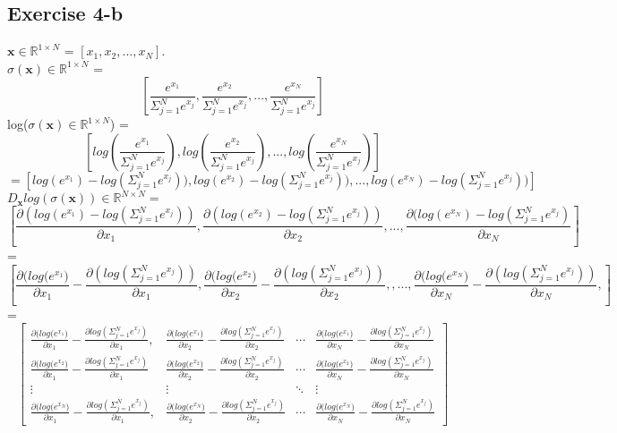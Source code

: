 \subsection*{Exercise 4-b}
$\mathbf{x} \in \mathbb{R}^{1 \times N}$ = $[x_{1}, x_{2},...,x_{N}]$.\\
$\sigma(\mathbf{x}) \in \mathbb{R}^{1 \times N}$ = 
\[
[\frac{e^{x_{1}}}{\Sigma_{j=1}^{N} e^{x_{j}}}, \frac{e^{x_{2}}}{\Sigma_{j=1}^{N} e^{x_{j}}},..., \frac{e^{x_{N}}}{\Sigma_{j=1}^{N} e^{x_{j}}} ]
\]
log($\sigma(\mathbf{x}) \in \mathbb{R}^{1 \times N}$) = 
\[
[log (\frac{e^{x_{1}}}{\Sigma_{j=1}^{N} e^{x_{j}}}),  log(\frac{e^{x_{2}}}{\Sigma_{j=1}^{N} e^{x_{j}}}),..., log (\frac{e^{x_{N}}}{\Sigma_{j=1}^{N} e^{x_{j}}})]
\]
\[
= [log({e^{x_{1}}})-log({\Sigma_{j=1}^{N} e^{x_{j}}})),  log({e^{x_{2}}})-log({\Sigma_{j=1}^{N} e^{x_{j}}})),..., log({e^{x_{N}}})-log({\Sigma_{j=1}^{N}e^{x_{j}}}))]
\]
\clearpage
$D_{\mathbf{x}}log(\sigma(\mathbf{x})) \in \mathbb{R}^{N \times N} = $
\\
\[
[\frac{\partial(log({e^{x_{1}}})-log({\Sigma_{j=1}^{N} e^{x_{j}}}))}{\partial x_{1}},  \frac{\partial(log({e^{x_{2}}})-log({\Sigma_{j=1}^{N} e^{x_{j}}}))}{\partial x_{2}},...,
\frac{\partial(log({e^{x_{N}}})-log({\Sigma_{j=1}^{N}e^{x_{j}}})}{\partial x_{N}}]
\]
=
\[
[\frac{\partial(log({e^{x_{1}})}}{\partial x_{1}}-\frac{\partial(log({\Sigma_{j=1}^{N} e^{x_{j}}}))}{\partial x_{1}},  \frac{\partial(log({e^{x_{2}})}}{\partial x_{2}}-\frac{\partial (log({\Sigma_{j=1}^{N} e^{x_{j}}}))}{\partial x_{2}}, ,...,
\frac{\partial(log({e^{x_{N}})}}{\partial x_{N}}-\frac{\partial(log({\Sigma_{j=1}^{N} e^{x_{j}}}))}{\partial x_{N}},]
\]
=
\[
\begin{bmatrix}
\frac{\partial(log({e^{x_{1}})}}{\partial x_{1}}-\frac{\partial log({\Sigma_{j=1}^{N} e^{x_{j}}})}{\partial x_{1}},& \frac{\partial(log({e^{x_{1}})}}{\partial x_{2}}-\frac{\partial log({\Sigma_{j=1}^{N} e^{x_{j}}})}{\partial x_{2}}&
\cdots &
\frac{\partial(log({e^{x_{1}})}}{\partial x_{N}}-\frac{\partial log({\Sigma_{j=1}^{N} e^{x_{j}}})}{\partial x_{N}}
\\
\frac{\partial(log({e^{x_{2}})}}{\partial x_{1}}-\frac{\partial log({\Sigma_{j=1}^{N} e^{x_{j}}})}{\partial x_{1}} &
\frac{\partial(log({e^{x_{2}})}}{\partial x_{2}}-\frac{\partial log({\Sigma_{j=1}^{N} e^{x_{j}}})}{\partial x_{2}}&
\cdots &
\frac{\partial(log({e^{x_{2}})}}{\partial x_{N}}-\frac{\partial log({\Sigma_{j=1}^{N} e^{x_{j}}})}{\partial x_{N}}
\\
\vdots & \vdots & \ddots & \vdots
\\
\frac{\partial(log({e^{x_{N}})}}{\partial x_{1}}-\frac{\partial log({\Sigma_{j=1}^{N} e^{x_{j}}})}{\partial x_{1}},& \frac{\partial(log({e^{x_{N}})}}{\partial x_{2}}-\frac{\partial log({\Sigma_{j=1}^{N} e^{x_{j}}})}{\partial x_{2}}&
\cdots &
\frac{\partial(log({e^{x_{N}})}}{\partial x_{N}}-\frac{\partial log({\Sigma_{j=1}^{N} e^{x_{j}}})}{\partial x_{N}}
\end{bmatrix}
\]
